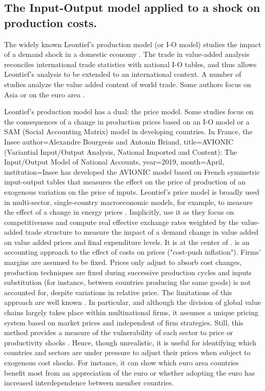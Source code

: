 \documentclass[11pt,a4paper]{article}
\begin{document}
\subsection{The Input-Output model applied to a shock on production costs.}
\label{subsec:io}
The widely known Leontief's production model (or I-O model) studies the impact of a demand shock in a domestic economy \citep{Leontief1951}. The trade in value-added analysis reconciles international trade statistics with national I-O tables, and thus allows Leontief's analysis to be extended to an international context. A number of studies \citep{Hummels2001,Daudin2006,Daudin2011, DeBacker2012,Johnson2012,Koopman2014, Amador2015,Los2016} analyze the value added content of world trade. Some authors focus on Asia \citep{Sato2014} or on the euro area \citep{Cappariello2015}.

Leontief's production model has a dual: the price model. Some studies focus on the consequences of a change in production prices based on an I-O model or a SAM (Social Accounting Matrix) model in developing countries. 
In France, the Insee \cite{Bourgeois2019} author={Alexandre Bourgeois and Antonin Briand}, title={AVIONIC (Variantial Input/Output Analysis, National Imported and Content): The Input/Output Model of National Accounts}, year=2019, month=April, institution={Insee} has developed the AVIONIC model based on French symmetric input-output tables that measures the effect on the price of production of an exogenous variation on the price of inputs. 
Leontief's price model is broadly used in multi-sector, single-country macroeconomic models, for example, to measure the effect of a change in energy prices \citep{Bournay2015, Sharify2013}. Implicitly, \cite{Bems2015} use it as they focus on competitiveness and compute real effective exchange rates weighted by the value-added trade structure to measure the impact of a demand change in value added on value added prices and final expenditure levels. It is at the center of \cite{Cochard2016}. 
\cite{Cochard2016} is an accounting approach to the effect of costs on prices ("cost-push inflation"). Firms' margins are assumed to be fixed. Prices only adjust to absorb cost changes, production techniques are fixed during successive production cycles and inputs substitution (for instance, between countries producing the same goods) is not accounted for, despite variations in relative price. The limitations of this approach are well known \citep{Folloni1994}. In particular, and although the division of global value chains largely takes place within multinational firms, it assumes a unique pricing system based on market prices and independent of firm strategies. Still, this method provides a measure of the vulnerability of each sector to price or productivity shocks \citep{Acemoglu2012,Carvalho2014}. Hence, though unrealistic, it is useful for identifying which countries and sectors are under pressure to adjust their prices when subject to exogenous cost shocks. For instance, it can show which euro area countries benefit most from an appreciation of the euro or whether adopting the euro has increased interdependence between member countries.
\end{document}
